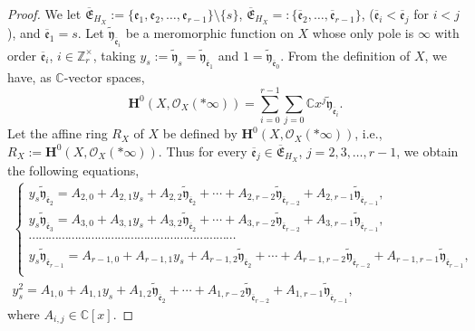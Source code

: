 \documentclass[10pt,a4paper]{amsart}
\def\CC{{\mathbb C}}
\def\ZZ{{\mathbb Z}}
\def\bH{{\mathbf F}}
\def\bH{{\mathbf H}}
\def\cO{{\mathcal O}}
\def\fe{{\mathfrak e}}
\def\tfy{{\widetilde{\mathfrak y}}}
\def\BfE{{\overline{\mathfrak E}}}
\def\Bfe{{\overline{\mathfrak e}}}
\numberwithin{equation}{section}
\begin{document}
\begin{proof}We let $\BfE_{H_X} :=\{\fe_1, \fe_2, \dots, \fe_{r-1}\}\setminus \{s\}$, $\BfE_{H_X} =:\{\Bfe_2, \dots, \Bfe_{r-1}\}$, ($\Bfe_i<\Bfe_j$ for $i<j$), and $\Bfe_1=s$.
Let $\tfy_{\Bfe_i}$ be a meromorphic function on $X$ whose only pole is $\infty$ with order $\Bfe_i$, $i\in \ZZ_r^\times$, taking $y_s:=\tfy_{s}=\tfy_{\Bfe_{1}}$ and $1=\tfy_{\Bfe_{0}}$.
From the definition of $X$, we have, as $\CC$-vector spaces,
\begin{equation}
\bH^0(X,\cO_X(*\infty))
= \sum_{i=0}^{r-1}\sum_{j=0} \CC x^j \tfy_{\Bfe_i}.
\label{2eq:R_Xdecompose1}
\end{equation}
Let the affine ring $R_X$ of $X$ be defined by $\bH^0(X,\cO_X(*\infty))$, i.e., $R_X:=\bH^0(X,\cO_X(*\infty))$.
Thus for every $\Bfe_j\in \BfE_{H_X}$, $j=2,3,\dots,r-1$, we obtain the following equations,
\begin{gather}
\begin{cases}
y_{s} \tfy_{\Bfe_2} = A_{2,0} +
 A_{2,1} y_{s}+
 A_{2,2} \tfy_{\Bfe_{2}}+
 \cdots +
 A_{2,r-2} \tfy_{\Bfe_{r-2}}+
 A_{2,r-1} \tfy_{\Bfe_{r-1}}, \\
y_{s} \tfy_{\Bfe_3}= A_{3,0} +
 A_{3,1} y_{s}+
 A_{3,2} \tfy_{\Bfe_{2}}+
 \cdots +
 A_{3,r-2} \tfy_{\Bfe_{r-2}}+
 A_{3,r-1} \tfy_{\Bfe_{r-1}}, \\
\cdots\cdots\cdots\cdots\cdots\cdots\cdots\cdots\cdots\cdots\cdots\cdots\cdots\cdots\cdots\cdots\cdots\cdots\cdots\cdots\cdots\\
y_{s} \tfy_{\Bfe_{r-1}} = A_{{r-1},0} +
 A_{r-1,1} y_{s}+
 A_{r-1,2} \tfy_{\Bfe_{2}}+
 \cdots +
 A_{r-1,r-2} \tfy_{\Bfe_{r-2}}+
 A_{r-1,r-1} \tfy_{\Bfe_{r-1}}, \\
\end{cases}
\label{2eq:WCF2}
\\
y_{s}^2 = A_{1,0} +
 A_{1,1} y_{s}+
 A_{1,2} \tfy_{\Bfe_{2}}+
 \cdots +
 A_{1,r-2} \tfy_{\Bfe_{r-2}}+
 A_{1,r-1} \tfy_{\Bfe_{r-1}},
\label{2eq:WCF3}
\end{gather}
where $A_{i,j} \in \CC[x]$.


\end{proof}
\end{document}
